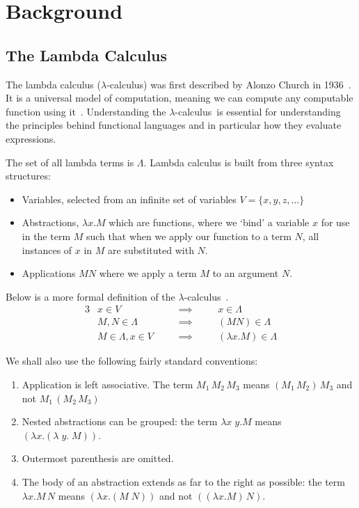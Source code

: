 \chapter{Background}
\label{chap:technical}

\section{The Lambda Calculus}
\label{bg:lcalc}
\newcommand{\lcalc}{$\lambda$-calculus}
\newcommand{\lCalc}{$\lambda$-Calculus}
\newcommand{\fto}{\rightarrow}
The lambda calculus (\lcalc) was first described by Alonzo Church in 1936~\cite{church1936unsolvable}. It is a universal model of computation, meaning we can compute any computable function using it~\cite{Turing_1937}. Understanding the \lcalc\ is essential for understanding the principles behind functional languages and in particular how they evaluate expressions.

The set of all lambda terms is $\Lambda$. Lambda calculus is built from three syntax structures:
\begin{itemize}
    \item Variables, selected from an infinite set of variables $V=\{x,y,z,\dots\}$
    \item Abstractions, $\lambda x. M$ which are functions, where we `bind' a variable $x$ for use in the term $M$ such that when we apply our function to a term $N$, all instances of $x$ in $M$ are substituted with $N$.
    \item Applications $M N$ where we apply a term $M$ to an argument $N$. 
\end{itemize}

\noindent Below is a more formal definition of the \lcalc~\cite{barendregt2013lambda}.
\begin{alignat*}{3}
&x \in V                 \quad && \implies \quad && x \in \Lambda               \\
&M,N \in \Lambda         \quad && \implies \quad && (M N) \in \Lambda           \\
&M \in \Lambda, x\in V   \quad && \implies \quad && (\lambda x. M) \in \Lambda  
\end{alignat*}

\noindent We shall also use the following fairly standard conventions:

\begin{enumerate}
    \item Application is left associative. The term $M_1\,M_2\,M_3$ means $(M_1\,M_2)\,M_3$ and not $M_1\,(M_2\,M_3)$
    \item Nested abstractions can be grouped: the term $\lambda x \;y. M$ means $(\lambda x . (\lambda\;y. \;M))$.
    \item Outermost parenthesis are omitted.
    \item The body of an abstraction extends as far to the right as possible: the term $\lambda x. M\,N$ means $(\lambda x. (M\;N))$ and not $((\lambda x. M)\,N)$. 
\end{enumerate}

